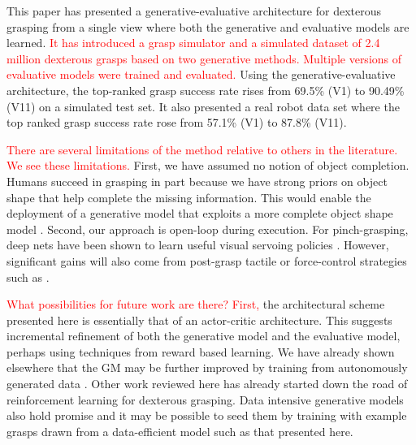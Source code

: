 This paper has presented a generative-evaluative architecture for dexterous grasping from a single view where both the generative and evaluative models are learned. \textcolor{red}{It has introduced a grasp simulator and a simulated dataset of 2.4 million dexterous grasps based on two generative methods. Multiple versions of evaluative models were trained and evaluated.} Using the generative-evaluative architecture, the top-ranked grasp success rate rises from 69.5\% (V1) to 90.49\% (V11) on a simulated test set. It also presented a real robot data set where the top ranked grasp success rate rose from 57.1\% (V1) to 87.8\% (V11).

\textcolor{red}{There are several limitations of the method relative to others in the literature. We see these limitations.} First, we have assumed no notion of object completion. Humans succeed in grasping in part because we have strong priors on object shape that help complete the missing information. This would enable the deployment of a generative model that exploits a more complete object shape model \cite{kopicki2015ijrr}. Second, our approach is open-loop during execution. For pinch-grasping, deep nets have been shown to learn useful visual servoing policies \cite{morrison18}. However, significant gains will also come from post-grasp tactile or force-control strategies such as \cite{Torres2018}. 

\textcolor{red}{What possibilities for future work are there? First,} the architectural scheme presented here is essentially that of an actor-critic architecture. This suggests incremental refinement of both the generative model and the evaluative model, perhaps using techniques from reward based learning. We have already shown elsewhere that the GM may be further improved by training from autonomously generated data \cite{kopicki2019ijrr}. Other work reviewed here \cite{mandikal2021dexterous,Osa2018} has already started down the road of reinforcement learning for dexterous grasping. Data intensive generative models also hold promise \cite{veres2017modeling} and it may be possible to seed them by training with example grasps drawn from a data-efficient model such as that presented here.\\
